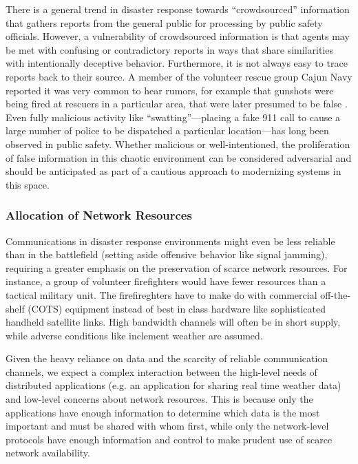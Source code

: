 \documentclass[]             %
{NASA}                       %
\theoremstyle{definition}
\begin{document}
There is a general trend in disaster response towards ``crowdsourced''
information that gathers reports from the general public for
processing by public safety officials. However, a vulnerability of
crowdsourced information is that agents may be met with confusing or
contradictory reports in ways that share similarities with
intentionally deceptive behavior. Furthermore, it is not always easy
to trace reports back to their source. A member of the volunteer
rescue group Cajun Navy reported it was very common to hear rumors,
for example that gunshots were being fired at rescuers in a particular
area, that were later presumed to be false \citationneeded. Even fully
malicious activity like ``swatting''---placing a fake 911 call to
cause a large number of police to be dispatched a particular
location---has long been observed in public safety. Whether malicious
or well-intentioned, the proliferation of false information in this
chaotic environment can be considered adversarial and should be
anticipated as part of a cautious approach to modernizing systems in
this space.

\subsubsection{Allocation of Network Resources}
Communications in disaster response environments might even be less
reliable than in the battlefield (setting aside offensive behavior
like signal jamming), requiring a greater emphasis on the preservation
of scarce network resources. For instance, a group of volunteer
firefighters would have fewer resources than a tactical military unit.
The firefireghters have to make do with commercial off-the-shelf
(COTS) equipment instead of best in class hardware like sophisticated
handheld satellite links. High bandwidth channels will often be in
short supply, while adverse conditions like inclement weather are
assumed.

Given the heavy reliance on data and the scarcity of reliable
communication channels, we expect a complex interaction between the
high-level needs of distributed applications (e.g. an application for
sharing real time weather data) and low-level concerns about network
resources. This is because only the applications have enough
information to determine which data is the most important and must be
shared with whom first, while only the network-level protocols have
enough information and control to make prudent use of scarce network
availability.
\end{document}
